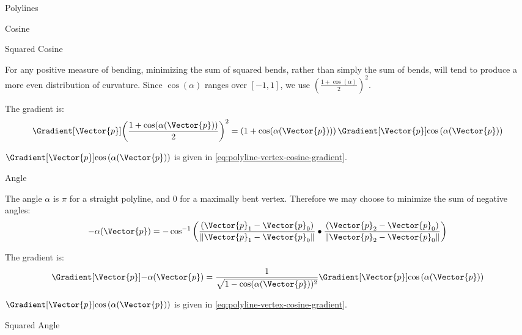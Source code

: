 \begin{plSection}{Polylines}
\begin{plSection}{Cosine}
\end{plSection}%
\begin{plSection}{Squared Cosine}
\label{sec:polyline-vertex-squared-cosine}

For any positive measure of bending,
minimizing the sum of squared bends,
rather than simply the sum of bends,
will tend to produce a more even distribution of curvature.
Since $\cos(\alpha)$ ranges over $[-1,1]$,
we use $\left( \frac{1 + \cos(\alpha)}{2} \right)^2$.

The gradient is:
\begin{equation}
\Gradient[\Vector{p}]
{\left( 
\frac{1 + \cos(\alpha(\Vector{p}))}{2} 
\right)^2}
=
\left( 1 + \cos(\alpha(\Vector{p})) \right)
\Gradient[\Vector{p}]{\cos\left(\alpha(\Vector{p})\right)}
\end{equation}

$\Gradient[\Vector{p}]{\cos\left(\alpha(\Vector{p})\right)}$ 
is given
in \cref{eq:polyline-vertex-cosine-gradient}.

\end{plSection}%
\begin{plSection}{Angle}
\label{sec:polyline-vertex-angle}

The angle $\alpha$ is $\pi$ for a straight polyline,
and $0$ for a maximally bent vertex.
Therefore we may choose to minimize the sum of negative angles:
\begin{equation}
-\alpha(\Vector{p}) =
-\cos^{-1} \left(
\frac{(\Vector{p}_1-\Vector{p}_0)}{\|\Vector{p}_1-\Vector{p}_0\|} 
\bullet
\frac{(\Vector{p}_2-\Vector{p}_0)}{\|\Vector{p}_2-\Vector{p}_0\|}
\right)
\end{equation}

The gradient is:
\begin{equation}
\Gradient[\Vector{p}]{-\alpha(\Vector{p})}
=
\frac{1}{\sqrt{ 1-\cos(\alpha(\Vector{p}))^2}}
\Gradient[\Vector{p}]{\cos\left(\alpha(\Vector{p})\right)}
\end{equation}

$\Gradient[\Vector{p}]{\cos\left(\alpha(\Vector{p})\right)}$ 
is given
in \cref{eq:polyline-vertex-cosine-gradient}.

\end{plSection}%
\begin{plSection}{Squared Angle}
\label{sec:polyline-vertex-squared-angle}


\end{plSection}
\end{plSection}
